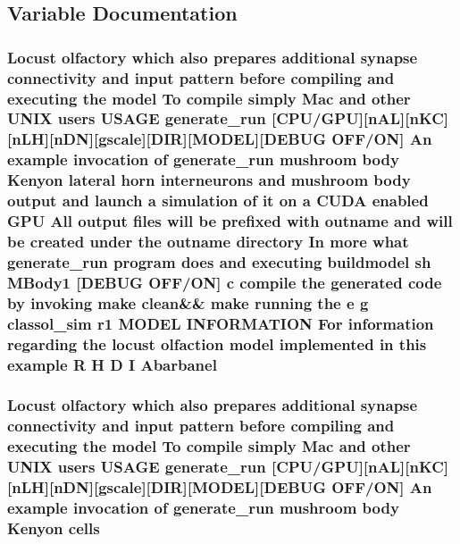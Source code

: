 \subsection{Variable Documentation}
\hypertarget{userproject_2MBody1__project_2README_8txt_a0954e396941fea721eadcc406fea7fd7}{
\subsubsection[{Abarbanel}]{\setlength{\rightskip}{0pt plus 5cm}Locust olfactory which also prepares additional synapse connectivity and input pattern before compiling and executing the {\bf model} To compile simply Mac and other U\+N\+I\+X users U\+S\+A\+G\+E {\bf generate\+\_\+run} \mbox{[}{\bf C\+P\+U}/{\bf G\+P\+U}\mbox{]}\mbox{[}n\+A\+L\mbox{]}\mbox{[}n\+K\+C\mbox{]}\mbox{[}n\+L\+H\mbox{]}\mbox{[}n\+D\+N\mbox{]}\mbox{[}gscale\mbox{]}\mbox{[}D\+I\+R\mbox{]}\mbox{[}M\+O\+D\+E\+L\mbox{]}\mbox{[}D\+E\+B\+U\+G O\+F\+F/O\+N\mbox{]} An example invocation of {\bf generate\+\_\+run} mushroom body Kenyon lateral horn {\bf interneurons} and mushroom body output and launch a simulation of {\bf it} on a C\+U\+D\+A enabled {\bf G\+P\+U} All output files will be prefixed {\bf with} outname and will be created under the outname {\bf directory} In more what {\bf generate\+\_\+run} program does and executing buildmodel sh M\+Body1 \mbox{[}D\+E\+B\+U\+G O\+F\+F/O\+N\mbox{]} c compile the generated {\bf code} by invoking make clean\&\& make running the e g classol\+\_\+sim r1 M\+O\+D\+E\+L I\+N\+F\+O\+R\+M\+A\+T\+I\+O\+N For information regarding the locust olfaction {\bf model} implemented {\bf in} this example {\bf R} H D I Abarbanel}}\label{userproject_2MBody1__project_2README_8txt_a0954e396941fea721eadcc406fea7fd7}
\hypertarget{userproject_2MBody1__project_2README_8txt_a2fae4890b44aedf0e413816d91282f01}{
\subsubsection[{cells}]{\setlength{\rightskip}{0pt plus 5cm}Locust olfactory which also prepares additional synapse connectivity and input pattern before compiling and executing the {\bf model} To compile simply Mac and other U\+N\+I\+X users U\+S\+A\+G\+E {\bf generate\+\_\+run} \mbox{[}{\bf C\+P\+U}/{\bf G\+P\+U}\mbox{]}\mbox{[}n\+A\+L\mbox{]}\mbox{[}n\+K\+C\mbox{]}\mbox{[}n\+L\+H\mbox{]}\mbox{[}n\+D\+N\mbox{]}\mbox{[}gscale\mbox{]}\mbox{[}D\+I\+R\mbox{]}\mbox{[}M\+O\+D\+E\+L\mbox{]}\mbox{[}D\+E\+B\+U\+G O\+F\+F/O\+N\mbox{]} An example invocation of {\bf generate\+\_\+run} mushroom body Kenyon cells}}\label{userproject_2MBody1__project_2README_8txt_a2fae4890b44aedf0e413816d91282f01}
